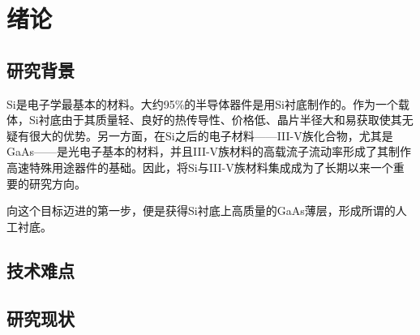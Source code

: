 % 

\chapter{绪论}

\section{研究背景}

Si是电子学最基本的材料。大约95\%的半导体器件是用Si衬底制作的。作为一个载体，Si衬底由于其质量轻、良好的热传导性、价格低、晶片半径大和易获取使其无疑有很大的优势。另一方面，在Si之后的电子材料——III-V族化合物，尤其是GaAs——是光电子基本的材料，并且III-V族材料的高载流子流动率形成了其制作高速特殊用途器件的基础。因此，将Si与III-V族材料集成成为了长期以来一个重要的研究方向。

向这个目标迈进的第一步，便是获得Si衬底上高质量的GaAs薄层，形成所谓的人工衬底。


\section{技术难点}

\section{研究现状}

\ifx\usechapbib\empty


\fi


